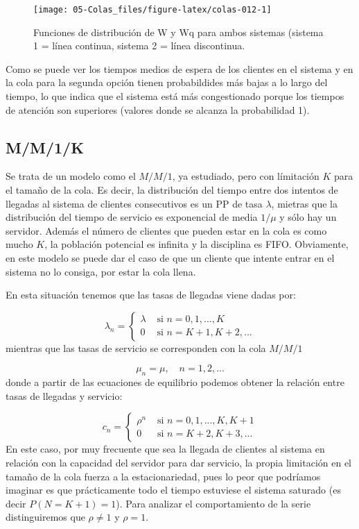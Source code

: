 \documentclass[
]{book}
\theoremstyle{definition}
\theoremstyle{definition}
\theoremstyle{definition}
\theoremstyle{definition}
\theoremstyle{remark}
\begin{document}
\begin{figure}

{\centering \texttt{[image: 05-Colas\_files/figure-latex/colas-012-1]} 

}

\caption{Funciones de distribución de W y Wq para ambos sistemas (sistema 1 = línea continua, sistema 2 = línea discontinua.}\label{fig:colas-012}
\end{figure}

Como se puede ver los tiempos medios de espera de los clientes en el sistema y en la cola para la segunda opción tienen probabildides más bajas a lo largo del tiempo, lo que indica que el sistema está más congestionado porque los tiempos de atención son superiores (valores donde se alcanza la probabilidad 1).

\hypertarget{mm1k}{%
\subsection{M/M/1/K}\label{mm1k}}

Se trata de un modelo como el \(M/M/1\), ya estudiado, pero con límitación \(K\) para el tamaño de la cola. Es decir, la distribución del tiempo entre dos intentos de llegadas al sistema de clientes consecutivos es un PP de tasa \(\lambda\), mietras que la distribución del tiempo de servicio es exponencial de media \(1/\mu\) y sólo hay un servidor. Además el número de clientes que pueden estar en la cola es como mucho \(K\), la población potencial es infinita y la disciplina es FIFO. Obviamente, en este modelo se puede dar el caso de que un cliente que intente entrar en el sistema no lo consiga, por estar la cola llena.

En esta situación tenemos que las tasas de llegadas viene dadas por:

\[
\lambda_n =
\begin{cases}
\lambda & \text{ si } n = 0, 1,...,K\\
0 & \text{ si } n = K+1, K+2,...
\end{cases}
\]
mientras que las tasas de servicio se corresponden con la cola \(M/M/1\)

\[
\mu_n = \mu, \quad n = 1, 2,...
\]
donde a partir de las ecuaciones de equilibrio podemos obtener la relación entre tasas de llegadas y servicio:

\[
c_n =
\begin{cases}
\rho^n & \text{ si } n = 0, 1,...,K, K+1\\
0 & \text{ si } n = K+2, K+3,...
\end{cases}
\]
En este caso, por muy frecuente que sea la llegada de clientes al sistema en relación con la capacidad del servidor para dar servicio, la propia limitación en el tamaño de la cola fuerza a la estacionariedad, pues lo peor que podríamos imaginar es que prácticamente todo el tiempo estuviese el sistema saturado (es decir \(P(N = K + 1) = 1\)). Para analizar el comportamiento de la serie distinguiremos que \(\rho \neq 1\) y \(\rho = 1\).
\end{document}
